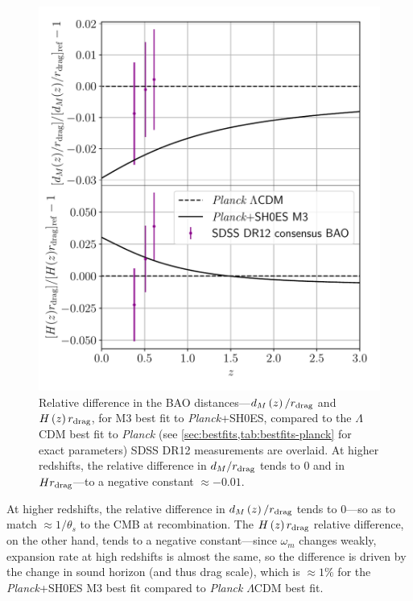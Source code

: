 \begin{figure}[htp!]
\includegraphics[width=\columnwidth]{img/bestfits-BAO.pdf}
\caption[Relative difference in the BAO distances between our best fit to {\it Planck}+SH0ES and the $\Lambda$CDM best fit to {\it Planck}]{Relative difference in the BAO distances---$d_M\left(z\right)/r_{\rm drag}$ and $H\left(z\right)r_{\rm drag}$,
for M3 best fit to {\it Planck}+SH0ES, compared to the $\Lambda$CDM best fit to {\it Planck} (see \cref{sec:bestfits,tab:bestfits-planck} for exact parameters)
SDSS DR12 measurements \citep{BOSS-DR12} are overlaid.
At higher redshifts, the relative difference in $d_M/r_{\rm drag}$ tends to 0 and in $Hr_{\rm drag}$---to a negative constant $\approx -0.01$.}
\label{fig:bestfits-BAO}
\end{figure}

At higher redshifts, the relative difference in $d_M\left(z\right)/r_{\rm drag}$  tends to 0---so as to match $\approx 1/\theta_s$ to the CMB at recombination.
The $H\left(z\right)r_{\rm drag}$ relative difference, on the other hand, tends to a negative constant---since $\omega_m$ changes weakly, expansion rate at high redshifts is almost the same, so the difference is driven by the change in sound horizon (and thus drag scale), which is $\approx 1\%$ for the {\it Planck}+SH0ES M3 best fit compared to {\it Planck} $\Lambda$CDM best fit.

